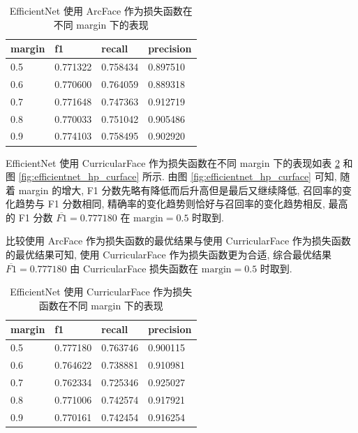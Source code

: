 \documentclass[12pt]{article}
\begin{document}
\begin{table}[htbp]
  \centering
  \caption{EfficientNet 使用 ArcFace 作为损失函数在不同 margin 下的表现}
  \label{tab:efficientnet_hp_arcface}
  \begin{tabular}{llll}
    \toprule
    margin & f1       & recall   & precision \\
    \midrule
    0.5 & 0.771322 & 0.758434 & 0.897510  \\
    0.6 & 0.770600 & 0.764059 & 0.889318  \\
    0.7 & 0.771648 & 0.747363 & 0.912719  \\
    0.8 & 0.770033 & 0.751042 & 0.905486  \\
    0.9 & 0.774103 & 0.758495 & 0.902920  \\
    \bottomrule
  \end{tabular}
\end{table}

EfficientNet 使用 CurricularFace 作为损失函数在不同 margin 下的表现如表 \ref{tab:efficientnet_hp_curface} 和图 \ref{fig:efficientnet_hp_curface} 所示. 由图 \ref{fig:efficientnet_hp_curface} 可知, 随着 margin 的增大, F1 分数先略有降低而后升高但是最后又继续降低, 召回率的变化趋势与 F1 分数相同, 精确率的变化趋势则恰好与召回率的变化趋势相反, 最高的 F1 分数 $\overline{F1}=0.777180$ 在 $\text{margin} = 0.5$ 时取到.

比较使用 ArcFace 作为损失函数的最优结果与使用 CurricularFace 作为损失函数的最优结果可知, 使用 CurricularFace 作为损失函数更为合适, 综合最优结果 $\overline{F1}=0.777180$ 由 CurricularFace 损失函数在 $\text{margin} = 0.5$ 时取到.

\begin{table}[htbp]
  \centering
  \caption{EfficientNet 使用 CurricularFace 作为损失函数在不同 margin 下的表现}
  \label{tab:efficientnet_hp_curface}
  \begin{tabular}{llll}
    \toprule
    margin & f1       & recall   & precision \\
    \midrule
    0.5 & 0.777180 & 0.763746 & 0.900115  \\
    0.6 & 0.764622 & 0.738881 & 0.910981  \\
    0.7 & 0.762334 & 0.725346 & 0.925027  \\
    0.8 & 0.771006 & 0.742574 & 0.917921  \\
    0.9 & 0.770161 & 0.742454 & 0.916254  \\
    \bottomrule
  \end{tabular}
\end{table}
\end{document}
